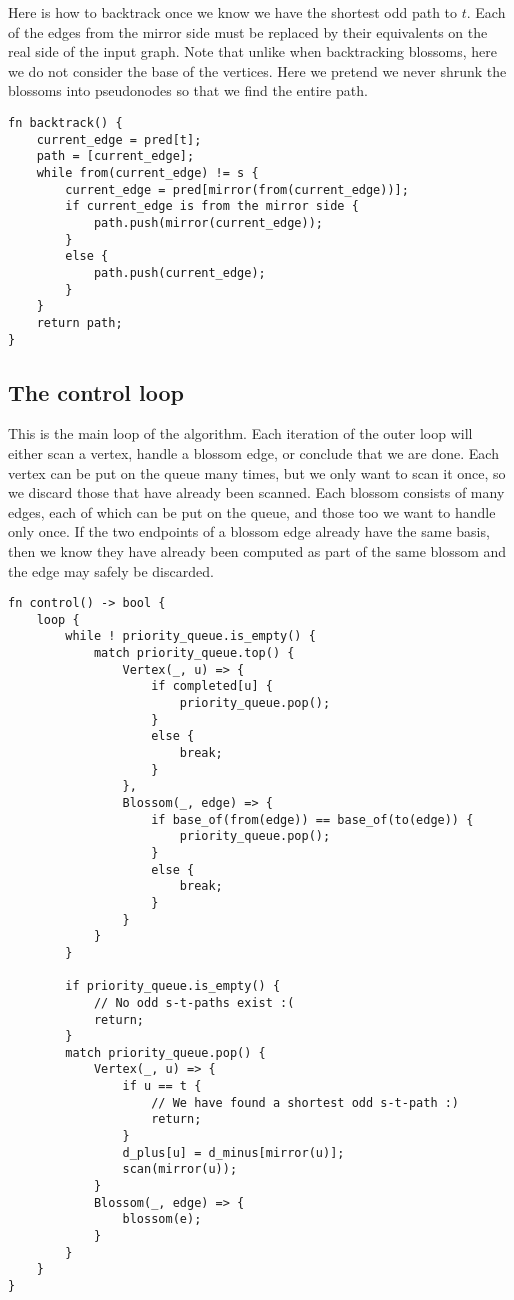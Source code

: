 Here is how to backtrack once we know we have the shortest odd path to $t$. Each of the edges from the mirror side must be replaced by their equivalents on the real side of the input graph. Note that unlike when backtracking blossoms, here we do not consider the base of the vertices. Here we pretend we never shrunk the blossoms into pseudonodes so that we find the entire path.
\begin{lstlisting}[caption={Backtracking},label=Listing,mathescape=true]
fn backtrack() {
    current_edge = pred[t];
    path = [current_edge];
    while from(current_edge) != s {
        current_edge = pred[mirror(from(current_edge))];
        if current_edge is from the mirror side {
            path.push(mirror(current_edge));
        }
        else {
            path.push(current_edge);
        }
    }
    return path;
}
\end{lstlisting}

\subsection{The control loop}
This is the main loop of the algorithm. Each iteration of the outer loop will either scan a vertex, handle a blossom edge, or conclude that we are done. Each vertex can be put on the queue many times, but we only want to scan it once, so we discard those that have already been scanned. Each blossom consists of many edges, each of which can be put on the queue, and those too we want to handle only once. If the two endpoints of a blossom edge already have the same basis, then we know they have already been computed as part of the same blossom and the edge may safely be discarded.
\begin{lstlisting}[caption={Control, the main loop},label=Listing,mathescape=true]
fn control() -> bool {
    loop {
        while ! priority_queue.is_empty() {
            match priority_queue.top() {
                Vertex(_, u) => {
                    if completed[u] {
                        priority_queue.pop();
                    }
                    else {
                        break;
                    }
                },
                Blossom(_, edge) => {
                    if base_of(from(edge)) == base_of(to(edge)) {
                        priority_queue.pop();
                    }
                    else {
                        break;
                    }
                }
            }
        }

        if priority_queue.is_empty() {
            // No odd s-t-paths exist :(
            return;
        }
        match priority_queue.pop() {
            Vertex(_, u) => {
                if u == t {
                    // We have found a shortest odd s-t-path :)
                    return;
                }
                d_plus[u] = d_minus[mirror(u)];
                scan(mirror(u));
            }
            Blossom(_, edge) => {
                blossom(e);
            }
        }
    }
}
\end{lstlisting}


